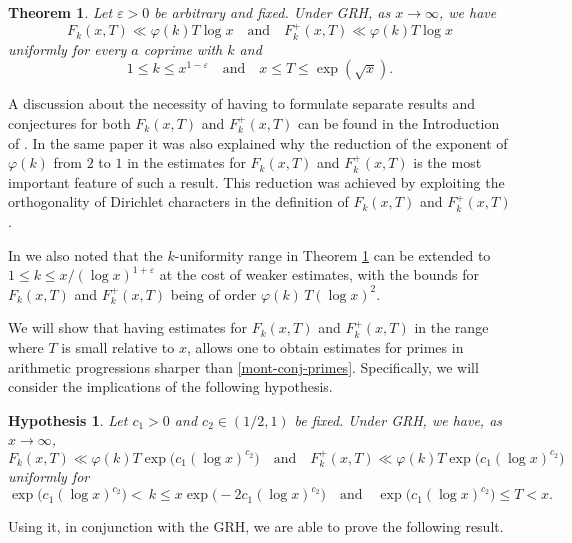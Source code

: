 \documentclass[pdflatex]{sn-jnl}%
\newcommand{\eps}{\ensuremath{\varepsilon}}
\theoremstyle{sltheorems}
\newtheorem*{Thm*}{Theorem}
\newtheorem{hypothesis}{Hypothesis}
\theoremstyle{plainrem}
\theoremstyle{definition}
\begin{document}
\begin{Thm*}\cite[Theorem~2]{mathannalen}
\label{yalmodifiedcor}
Let  $\eps>0$ be arbitrary and fixed.
Under GRH, as \( x \to \infty \),  we have
\[
F_{k}(x,T)  
\ll \varphi(k)T \log x
\quad
\textrm{and}
\quad
F^{+}_{k}(x,T) 
\ll \varphi(k)T \log x
\]
uniformly for  every $a$ coprime with $k$ and
\[
1 \le k \le  x^{1-\eps}
\quad\textrm{and} \quad
x \le T
\le \exp(\sqrt{x}).
\]
\end{Thm*}

A discussion about the necessity of having to formulate separate results and conjectures  for both
$F_{k}(x,T)$ and $F^{+}_{k}(x,T)$ can be found  in the Introduction of \cite{mathannalen}.
In the same paper it was also explained why
the reduction of the exponent of $\varphi(k)$ from $2$ to $1$ 
in the estimates for $F_{k}(x,T)$ and $F^{+}_{k}(x,T)$ is the most important
feature of such a result. 
This reduction was achieved by exploiting the orthogonality of Dirichlet
characters in the definition of $F_{k}(x,T)$ and $F^{+}_{k}(x,T)$.

In \cite[Remark 1]{mathannalen}  we also noted that the $k$-uniformity range
in Theorem \ref{yalmodifiedcor} can be extended to $1 \le k \le  x/ (\log x)^{1+\eps}$ 
at the cost of weaker estimates, with the bounds for $F_{k}(x,T)$ and 
$F_k^{+}(x,T)$ being of order $\varphi(k)\, T (\log x)^{2}$.

We will show that having estimates for 
$F_{k}(x,T)$  and $F^{+}_{k}(x,T)$ in the range
where $T$ is small relative to $x$, allows one to obtain  estimates for primes in arithmetic progressions sharper than
\eqref{mont-conj-primes}. Specifically, we will consider the implications of the following hypothesis.

\begin{hypothesis}\label{conjgpc2}
Let $c_1>0$ and $c_2\in (1/2,1)$ be fixed.
Under GRH, we have, as \( x \to \infty \), 
\[
F_{k}(x,T)  
\ll \varphi(k)T 
\exp\bigl(c_1(\log x)^{c_2}\bigr)
\quad
\textrm{and}
\quad
F^{+}_{k}(x,T)
\ll \varphi(k)T 
\exp\bigl(c_1(\log x)^{c_2}\bigr)
\]
uniformly for 
\[
\exp\bigl(c_1(\log x)^{c_2}\bigr)
<   ~ k \le 
x\exp\bigl(-2c_1(\log x)^{c_2}\bigr)
\quad\textrm{and} \quad
\exp\bigl(c_1(\log x)^{c_2}\bigr)
\le T
< x.
\]
\end{hypothesis}
 

Using it, in conjunction with the GRH, we are able to prove the following result.
 
\end{document}
